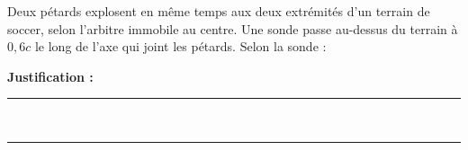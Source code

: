 Deux pétards explosent en même temps aux deux extrémités d'un terrain de soccer, selon l'arbitre immobile au centre. Une sonde passe au-dessus du terrain à $0{,}6c$ le long de l'axe qui joint les pétards. Selon la sonde :

\choices

\noindent\textbf{Justification :} \hrulefill \\[2.5ex]
\rule{\linewidth}{0.4pt} \\[2.5ex]
\rule{\linewidth}{0.4pt}
\vfill
